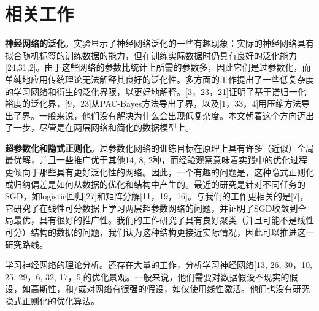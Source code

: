 \section{相关工作}
\textbf{神经网络的泛化}。实验显示了神经网络泛化的一些有趣现象：实际的神经网络具有拟合随机标签的训练数据的能力，但在训练实际数据时仍具有良好的泛化能力[24,31,2]。由于这些网络的参数比统计上所需的参数多，因此它们是过参数化，而单纯地应用传统理论无法解释其良好的泛化性。多方面的工作提出了一些低复杂度的学习网络和衍生的泛化界限，以更好地解释。[3，23，21]证明了基于谱归一化裕度的泛化界，[9，23]从PAC-Bayes方法导出了界，以及[1，33，4]用压缩方法导出了界。一般来说，他们没有解决为什么会出现低复杂度。本文朝着这个方向迈出了一步，尽管是在两层网络和简化的数据模型上。
\par
\textbf{超参数化和隐式正则化}。过参数化网络的训练目标在原理上具有许多（近似）全局最优解，并且一些推广优于其他14, 8, 2种，而经验观察意味着实践中的优化过程更倾向于那些具有更好泛化性的网络。因此，一个有趣的问题是，这种隐式正则化或归纳偏差是如何从数据的优化和结构中产生的。最近的研究是针对不同任务的SGD，如logistic回归[27]和矩阵分解[11，19，16]。与我们的工作更相关的是[7]，它研究了在线性可分数据上学习两层超参数网络的问题，并证明了SGD收敛到全局最优，具有很好的推广性。我们的工作研究了具有良好聚类（并且可能不是线性可分）结构的数据的问题，我们认为这种结构更接近实际情况，因此可以推进这一研究路线。
\par
学习神经网络的理论分析。还存在大量的工作，分析学习神经网络[13, 26, 30，10, 25, 29，6, 32, 17，5]的优化景观。一般来说，他们需要对数据假设不现实的假设，如高斯性，和/或对网络有很强的假设，如仅使用线性激活。他们也没有研究隐式正则化的优化算法。

